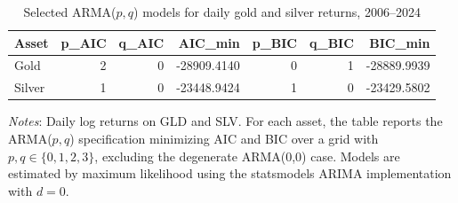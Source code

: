 \begin{table}[H]
\centering
\caption{Selected ARMA($p,q$) models for daily gold and silver returns, 2006--2024}
\label{tab:arma-selection}
\begin{tabular}{lrrrrrr}
\toprule
Asset & p_AIC & q_AIC & AIC_min & p_BIC & q_BIC & BIC_min \\
\midrule
Gold & 2 & 0 & -28909.4140 & 0 & 1 & -28889.9939 \\
Silver & 1 & 0 & -23448.9424 & 1 & 0 & -23429.5802 \\
\bottomrule
\end{tabular}

\vspace{0.2cm}
\begin{minipage}{0.9\textwidth}
\footnotesize
\textit{Notes}: Daily log returns on GLD and SLV. For each asset, the table reports the ARMA($p,q$) specification minimizing AIC and BIC over a grid with $p,q \in \{0,1,2,3\}$, excluding the degenerate ARMA(0,0) case. Models are estimated by maximum likelihood using the statsmodels ARIMA implementation with $d=0$.
\end{minipage}
\end{table}

